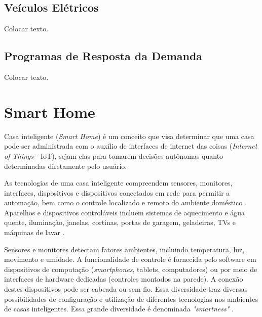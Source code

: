 \documentclass[12pt,article,compsoc]{IEEEtran}
\begin{document}

\subsection{Veículos Elétricos}

Colocar texto.


\subsection{Programas de Resposta da Demanda}

Colocar texto.


\section{Smart Home}\label{sec:smartHome}

Casa inteligente (\emph{Smart Home}) é um conceito que visa determinar que uma casa pode ser administrada com o auxílio de interfaces de internet das coisas (\emph{Internet of Things} - IoT), sejam elas para tomarem decisões autônomas quanto determinadas diretamente pelo usuário. 


As tecnologias de uma casa inteligente compreendem sensores, monitores, interfaces, dispositivos e dispositivos conectados em rede para permitir a automação, bem como o controle localizado e remoto do ambiente doméstico \cite{cook2012smart}. Aparelhos e dispositivos controláveis incluem sistemas de aquecimento e água quente, iluminação, janelas, cortinas, portas de garagem, geladeiras, TVs e máquinas de lavar \cite{robles2010applications}.

Sensores e monitores detectam fatores ambientes, incluindo temperatura, luz, movimento e umidade. A funcionalidade de controle é fornecida pelo software em dispositivos de computação (\emph{smartphones}, tablets, computadores) ou por meio de interfaces de hardware dedicadas (controles montados na parede). A conexão destes dispositivos pode ser cabeada ou sem fio. Essa diversidade traz diversas possibilidades de configuração e utilização de diferentes tecnologias nos ambientes de casas inteligentes. Essa grande diversidade é denominada \emph{"smartness"} \cite{harper2006inside}.
\end{document}
